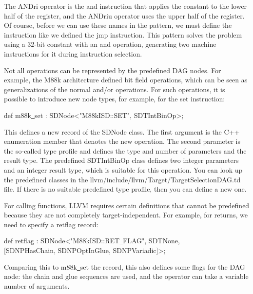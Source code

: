 The ANDri operator is the and instruction that applies the constant to the lower half of the register, and the ANDriu operator uses the upper half of the register. Of course, before we can use these names in the pattern, we must define the instruction like we defined the jmp instruction. This pattern solves the problem using a 32-bit constant with an and operation, generating two machine instructions for it during instruction selection.\par

Not all operations can be represented by the predefined DAG nodes. For example, the M88k architecture defined bit field operations, which can be seen as generalizations of the normal and/or operations. For such operations, it is possible to introduce new node types, for example, for the set instruction:\par

\begin{tcolorbox}[colback=white,colframe=black]
def m88k\underline{~}set : SDNode<"M88kISD::SET", SDTIntBinOp>;
\end{tcolorbox}

This defines a new record of the SDNode class. The first argument is the C++ enumeration member that denotes the new operation. The second parameter is the so-called type profile and defines the type and number of parameters and the result type. The predefined SDTIntBinOp class defines two integer parameters and an integer result type, which is suitable for this operation. You can look up the predefined classes in the llvm/include/llvm/Target/TargetSelectionDAG.td file. If there is no suitable predefined type profile, then you can define a new one.\par

For calling functions, LLVM requires certain definitions that cannot be predefined because they are not completely target-independent. For example, for returns, we need to specify a retflag record:\par

\begin{tcolorbox}[colback=white,colframe=black]
def retflag : SDNode<"M88kISD::RET\underline{~}FLAG", SDTNone, \\
\hspace*{3cm}[SDNPHasChain, SDNPOptInGlue, SDNPVariadic]>;
\end{tcolorbox}

Comparing this to m88k\underline{~}set the record, this also defines some flags for the DAG node: the chain and glue sequences are used, and the operator can take a variable number of arguments.\par

